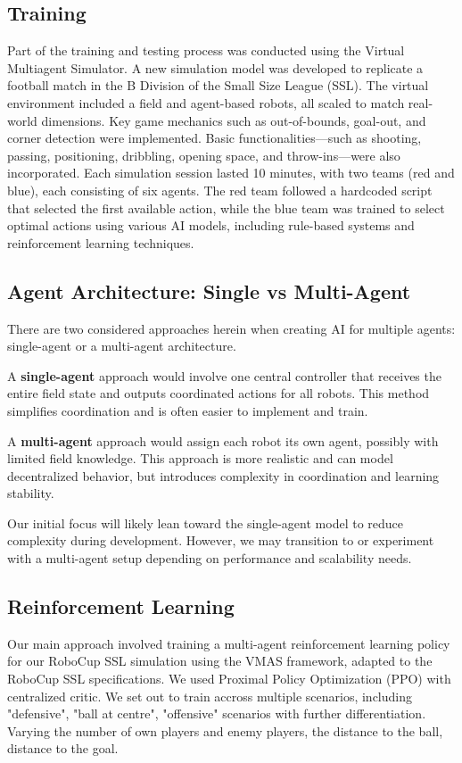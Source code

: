 \subsection{Training}
Part of the training and testing process was conducted using the Virtual Multiagent Simulator. A new simulation model was developed to replicate a football match in the B Division of the Small Size League (SSL). The virtual environment included a field and agent-based robots, all scaled to match real-world dimensions. Key game mechanics such as out-of-bounds, goal-out, and corner detection were implemented. Basic functionalities—such as shooting, passing, positioning, dribbling, opening space, and throw-ins—were also incorporated. Each simulation session lasted 10 minutes, with two teams (red and blue), each consisting of six agents. The red team followed a hardcoded script that selected the first available action, while the blue team was trained to select optimal actions using various AI models, including rule-based systems and reinforcement learning techniques.

\subsection{Agent Architecture: Single vs Multi-Agent}

There are two considered approaches herein when creating AI for multiple agents: single-agent or a multi-agent architecture.

A \textbf{single-agent} approach would involve one central controller that receives the entire field state and outputs coordinated actions for all robots. This method simplifies coordination and is often easier to implement and train.

A \textbf{multi-agent} approach would assign each robot its own agent, possibly with limited field knowledge. This approach is more realistic and can model decentralized behavior, but introduces complexity in coordination and learning stability.

Our initial focus will likely lean toward the single-agent model to reduce complexity during development. However, we may transition to or experiment with a multi-agent setup depending on performance and scalability needs.

\subsection{Reinforcement Learning}
Our main approach involved training a multi-agent reinforcement learning policy for our RoboCup SSL simulation using the VMAS framework, adapted to the RoboCup SSL specifications.
We used Proximal Policy Optimization (PPO) with centralized critic.
We set out to train accross multiple scenarios, including "defensive", "ball at centre", "offensive" scenarios with further differentiation.
Varying the number of own players and enemy players, the distance to the ball, distance to the goal.

